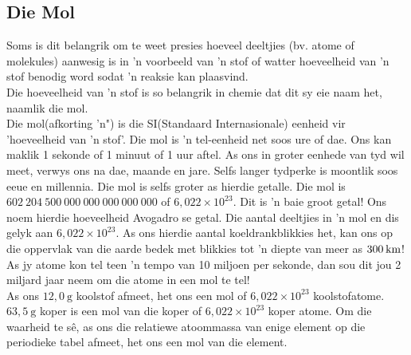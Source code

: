             \subsection*{Die Mol}
            \nopagebreak
Soms is dit belangrik om te weet presies hoeveel deeltjies (bv. atome of molekules) aanwesig is in 'n voorbeeld van 'n stof of watter hoeveelheid van 'n stof benodig word sodat  'n reaksie kan plaasvind.\\
Die hoeveelheid van  'n stof is so belangrik in chemie dat dit sy eie naam het, naamlik die mol.\\
 {Die mol(afkorting 'n") is die SI(Standaard Internasionale) eenheid vir 'hoeveelheid van 'n stof'. } 
Die mol is 'n tel-eenheid net soos ure of dae. Ons kan maklik 1 sekonde of 1 minuut of 1 uur aftel. As ons in groter eenhede van tyd wil meet, verwys ons na dae, maande en jare. Selfs langer tydperke is moontlik soos eeue en millennia. Die mol is selfs groter as hierdie getalle. Die mol is $602 ~204 ~500 ~000 ~000 ~000 ~000 ~000$ of $6,022 \times 10^{23}$. Dit is 'n baie groot getal! Ons noem hierdie hoeveelheid Avogadro se getal. 
 {Die aantal deeltjies in 'n mol en dis gelyk aan $6,022\ensuremath{\times}{10}^{23}$.} 
As ons hierdie aantal koeldrankblikkies het, kan ons op die oppervlak van die aarde bedek met blikkies tot 'n diepte van meer as $300\phantom{\rule{2pt}{0ex}}\text{km}$! As jy atome kon tel teen 'n tempo van 10 miljoen per sekonde, dan sou dit jou 2 miljard jaar neem om die atome in een mol te tel! \\
As ons $12,0 ~\text{g}$ koolstof afmeet, het ons een mol of $6,022 \times 10^{23}$ koolstofatome. $63,5 ~\text{g}$ koper is een mol van die koper of $6,022 \times 10^{23}$ koper atome. Om die waarheid te s\^{e}, as ons die relatiewe atoommassa van enige element op die periodieke tabel afmeet, het ons een mol van die element.

